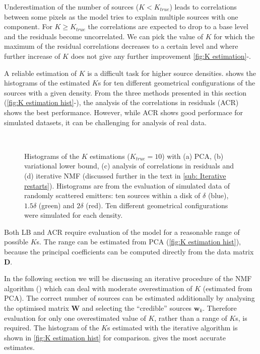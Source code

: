 \begin{enumerate}
Underestimation of the number of sources ($K<K_{true}$) leads to correlations between some pixels as the model tries to explain multiple sources with one component. For $K\geq K_{true}$ the correlations are expected to drop to a base level and the residuals become uncorrelated. We can pick the value of $K$ for which the maximum of the residual correlations decreases to a certain level and where further increase of $K$ does not give any further improvement \autoref{fig:K estimation}\gggg-\iii.
\end{enumerate}

A reliable estimation of $K$ is a difficult task for higher source densities.  shows the histograms of the estimated $K$s for ten different geometrical configurations of the sources with a given density. From the three methods presented in this section  (\autoref{fig:K estimation hist}\aaa-\ccc), the analysis of the correlations in residuals (ACR) shows the best performance. However, while ACR shows good performace for simulated datasets, it  can be challenging for analysis of real data.
%
\begin{figure}[!hbt]
	\newcommand{\sizef}{.4}		
	\centering
	\\
	\caption{Histograms of the $K$ estimations ($K_{true}=10$) with (a) PCA, (b) variational lower bound, (c) analysis of correlations in residuals and (d) iterative NMF (discussed further in the text in \autoref{sub: Iterative restarts}). Histograms are from the evaluation of simulated data of randomly scattered emitters: ten sources within a disk of $\delta$ (blue), $1.5\delta$ (green) and $2\delta$ (red). Ten different geometrical configurations were simulated for each density.}
	\label{fig:K estimation hist}
\end{figure}

Both LB and ACR require evaluation of the model for a reasonable range of possible $K$s. The range can be estimated from PCA  (\autoref{fig:K estimation hist}\ccc), because the principal coefficients can be computed directly from the data matrix $\bm{D}$.

In the following section we will be discussing an iterative procedure of the NMF algorithm (\inmf{}) which can deal with moderate overestimation of $K$  (estimated from PCA). The correct number of sources can be estimated additionally by analysing the optimised matrix $\bm{W}$ and selecting the ``credible'' sources $\bm{w}_k$. Therefore evaluation for only one overestimated value of $K$, rather than a range of $K$s, is required. The histogram of the $K$s estimated with the iterative algorithm is shown in  \autoref{fig:K estimation hist}\ddd{} for comparison. \inmf{} gives the most accurate estimates. 
\afterpage{\clearpage}

